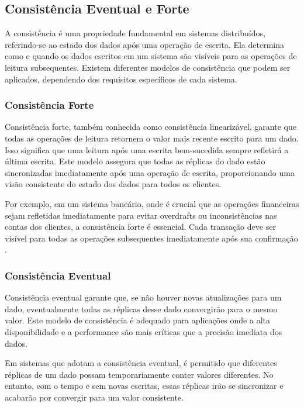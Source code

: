 \subsection{Consistência Eventual e Forte}

A consistência é uma propriedade fundamental em sistemas distribuídos, referindo-se ao estado dos dados após uma operação de escrita. Ela determina como e quando os dados escritos em um sistema são visíveis para as operações de leitura subsequentes. Existem diferentes modelos de consistência que podem ser aplicados, dependendo dos requisitos específicos de cada sistema.

\subsubsection{Consistência Forte}

Consistência forte, também conhecida como consistência linearizável, garante que todas as operações de leitura retornem o valor mais recente escrito para um dado. Isso significa que uma leitura após uma escrita bem-sucedida sempre refletirá a última escrita. Este modelo assegura que todas as réplicas do dado estão sincronizadas imediatamente após uma operação de escrita, proporcionando uma visão consistente do estado dos dados para todos os clientes.

Por exemplo, em um sistema bancário, onde é crucial que as operações financeiras sejam refletidas imediatamente para evitar overdrafts ou inconsistências nas contas dos clientes, a consistência forte é essencial. Cada transação deve ser visível para todas as operações subsequentes imediatamente após sua confirmação \cite{hewitt2010}.

\subsubsection{Consistência Eventual}

Consistência eventual garante que, se não houver novas atualizações para um dado, eventualmente todas as réplicas desse dado convergirão para o mesmo valor. Este modelo de consistência é adequado para aplicações onde a alta disponibilidade e a performance são mais críticas que a precisão imediata dos dados.

Em sistemas que adotam a consistência eventual, é permitido que diferentes réplicas de um dado possam temporariamente conter valores diferentes. No entanto, com o tempo e sem novas escritas, essas réplicas irão se sincronizar e acabarão por convergir para um valor consistente.

